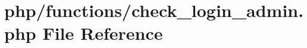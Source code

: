 \hypertarget{check__login__admin_8php}{\section{php/functions/check\-\_\-login\-\_\-admin.php File Reference}
\label{check__login__admin_8php}
}
